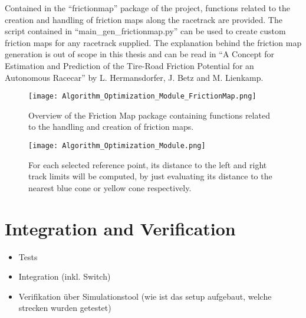 Contained in the ``frictionmap'' package of the project, functions related to the creation and handling of friction maps along the racetrack are provided.
The script contained in ``main\_gen\_frictionmap.py'' can be used to create custom friction maps for any racetrack supplied. The explanation behind the friction map generation is out of scope in this thesis and can be read in ``A Concept for Estimation and Prediction of the Tire-Road Friction Potential for an Autonomous Racecar'' by L. Hermansdorfer, J. Betz and M. Lienkamp. \cite{friction_map_generation}
\begin{figure}[H]
    \centering
    \texttt{[image: Algorithm\_Optimization\_Module\_FrictionMap.png]}
    \caption{Overview of the Friction Map package containing functions related to the handling and creation of friction maps.}
    \label{fig:Optimization Algorithm Module Overview}
\end{figure}

\begin{figure}[H]
    \centering
    \texttt{[image: Algorithm\_Optimization\_Module.png]}
    \caption{For each selected reference point, its distance to the left and right track limits will be computed, by just evaluating its distance to the nearest blue cone or yellow cone respectively.}
    \label{fig:Optimization Algorithm Module Overview}
\end{figure}

\section{Integration and Verification} \label{sec:Integration and Verification}

\begin{itemize}
    \item Tests
    \item Integration (inkl. Switch)
    \item Verifikation über Simulationstool (wie ist das setup aufgebaut, welche strecken wurden getestet)
\end{itemize}

